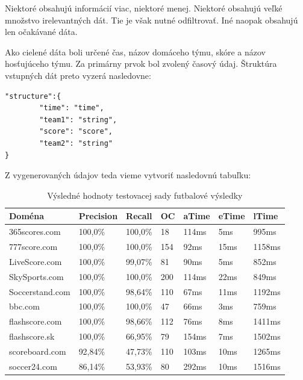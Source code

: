 Niektoré obsahujú informácií viac, niektoré menej. Niektoré obsahujú veľké množstvo irelevantných dát. Tie je však nutné odfiltrovať. Iné naopak obsahujú len očakávané dáta.

\bigskip

Ako cielené dáta boli určené čas, názov domáceho týmu, skóre a názov hosťujúceho týmu. Za primárny prvok bol zvolený časový údaj. Štruktúra vstupných dát preto vyzerá nasledovne:

\bigskip

\begin{lstlisting}
"structure":{
        "time": "time",
        "team1": "string",
        "score": "score",
        "team2": "string"
}
\end{lstlisting}

\bigskip

Z vygenerovaných údajov teda vieme vytvoriť nasledovnú tabuľku:

\begin{table}[hbt]
\caption{Výsledné hodnoty testovacej sady futbalové výsledky}
\centering
\begin{tabular}{|l|l|l|l|l|l|l|}
\hline
\textbf{Doména}          & \textbf{Precision} & \textbf{Recall}  & \textbf{OC}  & \textbf{aTime} & \textbf{eTime} & \textbf{lTime}  \\ \hline
365scores.com   & 100,0\%   & 100,0\% & 18  & 114ms & 5ms   & 995ms  \\ \hline
777score.com    & 100,0\%   & 100,0\% & 154 & 92ms  & 15ms  & 1158ms \\ \hline
LiveScore.com   & 100,0\%   & 99,07\% & 81  & 90ms  & 5ms   & 852ms  \\ \hline
SkySports.com   & 100,0\%   & 100,0\% & 200 & 114ms & 22ms  & 849ms  \\ \hline
Soccerstand.com & 100,0\%   & 98,64\% & 110 & 67ms  & 11ms  & 1192ms \\ \hline
bbc.com         & 100,0\%   & 100,0\% & 47  & 66ms  & 3ms   & 759ms  \\ \hline
flashscore.com  & 100,0\%   & 98,66\% & 112 & 76ms  & 8ms   & 1411ms \\ \hline
flashscore.sk   & 100,0\%   & 66,95\% & 79  & 154ms & 7ms   & 1502ms \\ \hline
scoreboard.com  & 92,84\%   & 47,73\% & 110 & 103ms & 10ms  & 1265ms \\ \hline
soccer24.com    & 86,14\%   & 53,93\% & 80  & 292ms & 10ms  & 1516ms \\ \hline
\end{tabular}
\end{table}

